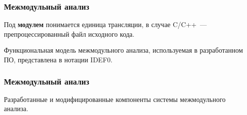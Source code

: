 \documentclass[10pt,gray]{beamer}
\begin{document}

\begin{frame}
\frametitle{Межмодульный анализ}

Под \textbf{модулем} понимается единица трансляции, в случае C/C++~--- препроцессированный файл исходного кода.

Функциональная модель межмодульного анализа, используемая в разработанном ПО, представлена в нотации IDEF0.
\begin{figure}[h]
\end{figure}
\end{frame}

\begin{frame}
\frametitle{Межмодульный анализ}
Разработанные и модифицированные компоненты системы межмодульного анализа.
\begin{figure}[h]
\end{figure}
\end{frame}
\end{document}
